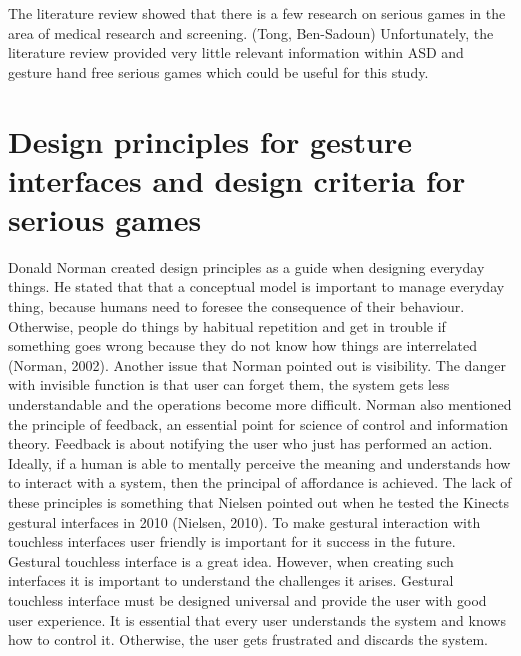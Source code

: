The literature review showed that there is a few research on serious games in the area of medical research and screening. (Tong, Ben-Sadoun) Unfortunately, the literature review provided very little relevant information within ASD and gesture hand free serious games which could be useful for this study.



\section{Design principles for gesture interfaces and design criteria for serious games}
\label{sec:designprinciples}
Donald Norman created design principles as a guide when designing everyday things. He stated that that a conceptual model is important to manage everyday thing, because humans need to foresee the consequence of their behaviour. Otherwise, people do things by habitual repetition and get in trouble if something goes wrong because they do not know how things are interrelated (Norman, 2002). Another issue that Norman pointed out is visibility. The danger with invisible function is that user can forget them, the system gets less understandable and the operations become more difficult. Norman also mentioned the principle of feedback, an essential point for science of control and information theory. Feedback is about notifying the user who just has performed an action. Ideally, if a human is able to mentally perceive the meaning and understands how to interact with a system, then the principal of affordance is achieved. The lack of these principles is something that Nielsen pointed out when he tested the Kinects gestural interfaces in 2010 (Nielsen, 2010).  To make gestural interaction with touchless interfaces user friendly is important for it success in the future. 
Gestural touchless interface is a great idea. However, when creating such interfaces it is important to understand the challenges it arises. Gestural touchless interface must be designed universal and provide the user with good user experience. It is essential that every user understands the system and knows how to control it. Otherwise, the user gets frustrated and discards the system. 

